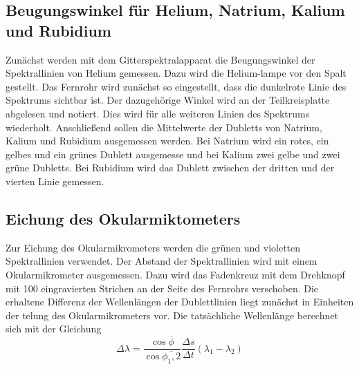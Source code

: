 \subsection{Beugungswinkel für Helium, Natrium, Kalium und Rubidium}
Zunächst werden mit dem Gitterspektralapparat die Beugungswinkel der Spektrallinien von Helium gemessen. Dazu wird die Helium-lampe vor den Spalt gestellt. Das Fernrohr wird zunächst so eingestellt, dass die dunkelrote Linie des Spektrums sichtbar ist. Der dazugehörige Winkel wird an der Teilkreisplatte abgelesen und notiert. Dies wird für alle weiteren Linien des Spektrums wiederholt.
Anschließend sollen die Mittelwerte der Dubletts von Natrium, Kalium und Rubidium ausgemessen werden. Bei Natrium wird ein rotes, ein gelbes und ein grünes Dublett ausgemesse und bei Kalium zwei gelbe und zwei grüne Dubletts. Bei Rubidium wird das Dublett zwischen der dritten und der vierten Linie gemessen.

\subsection{Eichung des Okularmiktometers}
Zur Eichung des Okularmikrometers werden die grünen und violetten Spektrallinien verwendet. Der Abstand der Spektrallinien wird mit einem Okularmikrometer ausgemessen. Dazu wird das Fadenkreuz mit dem Drehknopf mit 100 eingravierten Strichen an der Seite des Fernrohrs verschoben. Die erhaltene Differenz der Wellenlängen der Dublettlinien liegt zunächst in Einheiten der telung des Okularmikrometers vor. Die tatsächliche Wellenlänge berechnet sich mit der Gleichung
\begin{equation}
   \Delta \lambda = \frac{\cos\overline{\phi}}{\cos\overline{\phi_1,2}}\frac{\Delta s}{\Delta t}(\lambda_1 -\lambda_2)
 \end{equation}
